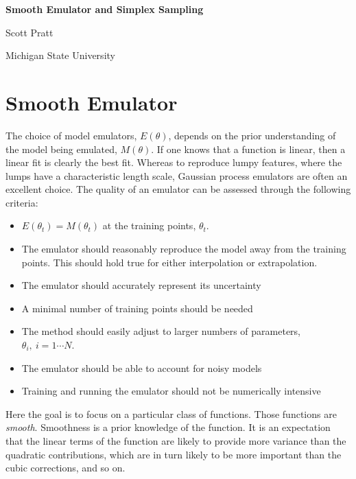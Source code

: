 



\centerline{\bf\Large Smooth Emulator and Simplex Sampling}
\centerline{Scott Pratt}
\centerline{Michigan State University}

\section{Smooth Emulator}

The choice of model emulators, $E(\theta)$, depends on the prior understanding of the model being emulated, $M(\theta)$. If one knows that  a function is linear, then a linear fit is clearly the best fit. Whereas to reproduce lumpy features, where the lumps have a characteristic length scale, Gaussian process emulators are often an excellent choice. The quality of an emulator can be assessed through the following criteria:
\begin{itemize}
  \item $E(\theta_t)=M(\theta_t)$ at the training points, $\theta_t$. 
  \item The emulator should reasonably reproduce the model away from the training points. This should hold true for either interpolation or extrapolation.
  \item The emulator should accurately represent its uncertainty
  \item A minimal number of training points should be needed
  \item The method should easily adjust to larger numbers of parameters, $\theta_i,~i=1\cdots N$.
  \item The emulator should be able to account for noisy models
  \item Training and running the emulator should not be numerically intensive
\end{itemize}

Here the goal is to focus on a particular class of functions. Those functions are {\it smooth}. Smoothness is a prior knowledge of the function. It is an expectation that the linear terms of the function are likely to provide more variance than the quadratic contributions, which are in turn likely to be more important than the cubic corrections, and so on. 

